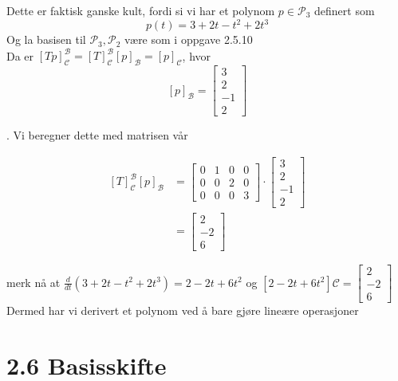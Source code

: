 \documentclass[a4paper,norsk]{article}
\begin{document}
Dette er faktisk ganske kult, fordi si vi har et polynom $ p \in \mathcal{P}_3 $ definert som
\[
    p(t) = 3 + 2t - t^2 + 2t^3
\]
Og la basisen til $ \mathcal{P}_3, \mathcal{P}_2  $ være som i oppgave 2.5.10\\ 
Da er $ \left[ Tp \right] _{\mathcal{C}}^{\mathcal{B}} = \left[ T \right] _{\mathcal{C}}^{\mathcal{B}} \left[ p \right] _{\mathcal{B}} = \left[ p \right] _{\mathcal{C}} $, hvor 
\[
    \left[ p \right] _{\mathcal{B}} = \begin{bmatrix}
        3\\ 2\\ -1\\ 2
    \end{bmatrix} 
\]

. Vi beregner dette med matrisen vår

\begin{align*}
  \left[ T \right] _{\mathcal{C}}^{\mathcal{B}} \left[ p \right] _{\mathcal{B}} &=
      \begin{bmatrix}
        0&1&0&0\\
        0&0&2&0\\
        0&0&0&3
    \end{bmatrix} \cdot \begin{bmatrix}
      3\\ 2\\ -1\\ 2
  \end{bmatrix} \\
  &= \begin{bmatrix}
      2\\ -2\\ 6
  \end{bmatrix} 
\end{align*}

merk nå at $ \frac{ d }{ dt } \left( 3 + 2t - t^2 + 2t^3 \right) = 2 - 2t + 6t^2  $ og $ \left[ 2 - 2t + 6t^2 \right] {\mathcal{C}} = \begin{bmatrix}
    2\\ -2\\ 6
\end{bmatrix}   $ Dermed har vi derivert et polynom ved å bare gjøre lineære operasjoner

\section*{2.6 Basisskifte}
\end{document}
